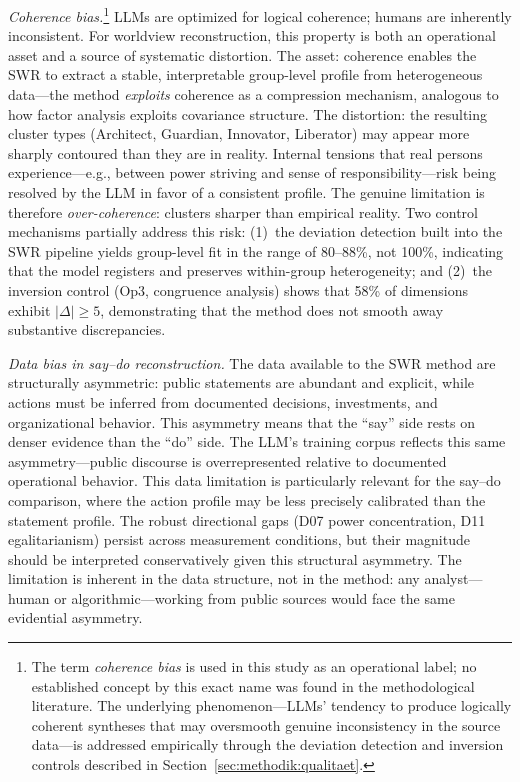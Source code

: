 \documentclass[12pt,a4paper]{article}
\begin{document}
\emph{Coherence bias.}\footnote{The term \emph{coherence bias} is used in this study as an operational label; no established concept by this exact name was found in the methodological literature. The underlying phenomenon---LLMs' tendency to produce logically coherent syntheses that may oversmooth genuine inconsistency in the source data---is addressed empirically through the deviation detection and inversion controls described in Section~\ref{sec:methodik:qualitaet}.} LLMs are optimized for logical coherence; humans are inherently inconsistent. For worldview reconstruction, this property is both an operational asset and a source of systematic distortion. The asset: coherence enables the SWR to extract a stable, interpretable group-level profile from heterogeneous data---the method \emph{exploits} coherence as a compression mechanism, analogous to how factor analysis exploits covariance structure. The distortion: the resulting cluster types (Architect, Guardian, Innovator, Liberator) may appear more sharply contoured than they are in reality. Internal tensions that real persons experience---e.g., between power striving and sense of responsibility---risk being resolved by the LLM in favor of a consistent profile. The genuine limitation is therefore \emph{over-coherence}: clusters sharper than empirical reality. Two control mechanisms partially address this risk: (1)~the deviation detection built into the SWR pipeline yields group-level fit in the range of 80--88\%, not 100\%, indicating that the model registers and preserves within-group heterogeneity; and (2)~the inversion control (Op3, congruence analysis) shows that 58\% of dimensions exhibit $|\Delta| \geq 5$, demonstrating that the method does not smooth away substantive discrepancies.

\emph{Data bias in say--do reconstruction.} The data available to the SWR method are structurally asymmetric: public statements are abundant and explicit, while actions must be inferred from documented decisions, investments, and organizational behavior. This asymmetry means that the ``say'' side rests on denser evidence than the ``do'' side. The LLM's training corpus reflects this same asymmetry---public discourse is overrepresented relative to documented operational behavior. This data limitation is particularly relevant for the say--do comparison, where the action profile may be less precisely calibrated than the statement profile. The robust directional gaps (D07 power concentration, D11 egalitarianism) persist across measurement conditions, but their magnitude should be interpreted conservatively given this structural asymmetry. The limitation is inherent in the data structure, not in the method: any analyst---human or algorithmic---working from public sources would face the same evidential asymmetry.
\end{document}
